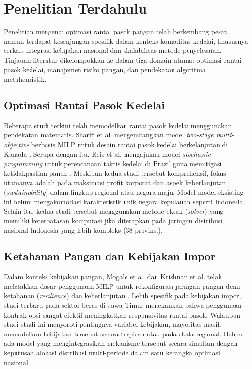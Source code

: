 \documentclass{file/TA-ITS}
\theoremstyle{definition}
\theoremstyle{definition}
\theoremstyle{plain}
\begin{document}
\section{Penelitian Terdahulu}

Penelitian mengenai optimasi rantai pasok pangan telah berkembang pesat, namun terdapat kesenjangan spesifik dalam konteks komoditas kedelai, khususnya terkait integrasi kebijakan nasional dan skalabilitas metode penyelesaian. Tinjauan literatur dikelompokkan ke dalam tiga domain utama: optimasi rantai pasok kedelai, manajemen risiko pangan, dan pendekatan algoritma metaheuristik.

\subsection{Optimasi Rantai Pasok Kedelai}
Beberapa studi terkini telah memodelkan rantai pasok kedelai menggunakan pendekatan matematis. Sharifi et al. mengembangkan model \textit{two-stage multi-objective} berbasis MILP untuk desain rantai pasok kedelai berkelanjutan di Kanada \cite{SHARIFI2023}. Serupa dengan itu, Reis et al. mengajukan model \textit{stochastic programming} untuk perencanaan taktis kedelai di Brazil guna memitigasi ketidakpastian panen \cite{reis2023stochastic}. Meskipun kedua studi tersebut komprehensif, fokus utamanya adalah pada maksimasi profit korporat dan aspek keberlanjutan (\textit{sustainability}) dalam lingkup regional atau negara maju. Model-model eksisting ini belum mengakomodasi karakteristik unik negara kepulauan seperti Indonesia. Selain itu, kedua studi tersebut menggunakan metode eksak (\textit{solver}) yang memiliki keterbatasan komputasi jika diterapkan pada jaringan distribusi nasional Indonesia yang lebih kompleks (38 provinsi).

\subsection{Ketahanan Pangan dan Kebijakan Impor}
Dalam konteks kebijakan pangan, Mogale et al. dan Krishnan et al. telah meletakkan dasar penggunaan MILP untuk rekonfigurasi jaringan pangan demi ketahanan (\textit{resilience}) dan keberlanjutan \cite{Mogale2020, Krishnan2022robust}. Lebih spesifik pada kebijakan impor, studi terbaru pada sektor beras di Jawa Timur \cite{muhammad_beras_jawa_2025} menekankan bahwa penggunaan kontrak opsi sangat efektif meningkatkan responsivitas rantai pasok. Walaupun studi-studi ini menyoroti pentingnya variabel kebijakan, mayoritas masih memodelkan kebijakan tersebut secara terpisah atau pada skala regional. Belum ada model yang mengintegrasikan mekanisme tersebut secara simultan dengan keputusan alokasi distribusi multi-periode dalam satu kerangka optimasi nasional.
\end{document}
